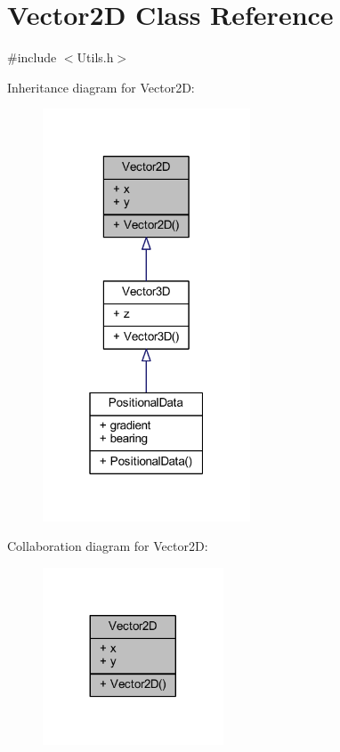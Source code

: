 \hypertarget{class_vector2_d}{}\section{Vector2D Class Reference}
\label{class_vector2_d}


{\ttfamily \#include $<$Utils.\+h$>$}



Inheritance diagram for Vector2D\+:
\nopagebreak
\begin{figure}[H]
\begin{center}
\leavevmode
\includegraphics[width=175pt]{class_vector2_d__inherit__graph}
\end{center}
\end{figure}


Collaboration diagram for Vector2D\+:
\nopagebreak
\begin{figure}[H]
\begin{center}
\leavevmode
\includegraphics[width=152pt]{class_vector2_d__coll__graph}
\end{center}
\end{figure}
